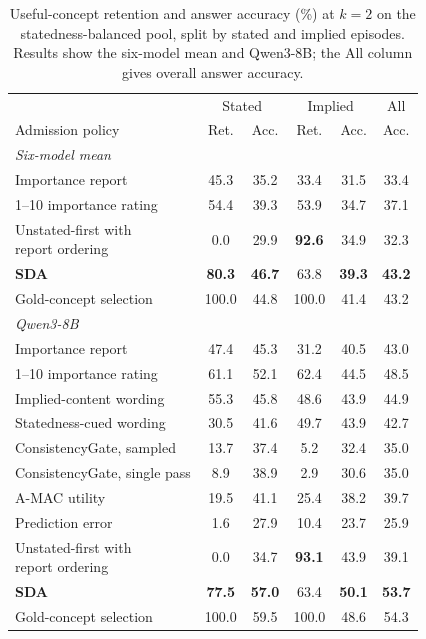 \begin{table}[!htbp]
\centering
\caption{Useful-concept retention and answer accuracy (\%) at $k=2$ on the statedness-balanced pool, split by stated and implied episodes. Results show the six-model mean and Qwen3-8B; the All column gives overall answer accuracy.}
\label{tab:splitfull}
\footnotesize
\setlength{\tabcolsep}{1.9pt}
\begin{tabular}{lccccc}
\toprule
 & \multicolumn{2}{c}{Stated} & \multicolumn{2}{c}{Implied} & All \\
\cmidrule(lr){2-3}\cmidrule(lr){4-5}\cmidrule(lr){6-6}
Admission policy & Ret. & Acc. & Ret. & Acc. & Acc. \\
\midrule
\multicolumn{6}{l}{\emph{Six-model mean}} \\
Importance report & 45.3 & 35.2 & 33.4 & 31.5 & 33.4 \\
1--10 importance rating & 54.4 & 39.3 & 53.9 & 34.7 & 37.1 \\
\shortstack[l]{Unstated-first with\\\quad report ordering} & 0.0 & 29.9 & \textbf{92.6} & 34.9 & 32.3 \\
\textbf{SDA} & \textbf{80.3} & \textbf{46.7} & 63.8 & \textbf{39.3} & \textbf{43.2} \\
 Gold-concept selection & 100.0 & 44.8 & 100.0 & 41.4 & 43.2 \\
\midrule
\multicolumn{6}{l}{\emph{Qwen3-8B}} \\
Importance report & 47.4 & 45.3 & 31.2 & 40.5 & 43.0 \\
1--10 importance rating & 61.1 & 52.1 & 62.4 & 44.5 & 48.5 \\
Implied-content wording & 55.3 & 45.8 & 48.6 & 43.9 & 44.9 \\
Statedness-cued wording & 30.5 & 41.6 & 49.7 & 43.9 & 42.7 \\
ConsistencyGate, sampled & 13.7 & 37.4 & 5.2 & 32.4 & 35.0 \\
ConsistencyGate, single pass & 8.9 & 38.9 & 2.9 & 30.6 & 35.0 \\
A-MAC utility & 19.5 & 41.1 & 25.4 & 38.2 & 39.7 \\
Prediction error & 1.6 & 27.9 & 10.4 & 23.7 & 25.9 \\
\shortstack[l]{Unstated-first with\\\quad report ordering} & 0.0 & 34.7 & \textbf{93.1} & 43.9 & 39.1 \\
\textbf{SDA} & \textbf{77.5} & \textbf{57.0} & 63.4 & \textbf{50.1} & \textbf{53.7} \\
 Gold-concept selection & 100.0 & 59.5 & 100.0 & 48.6 & 54.3 \\
\bottomrule
\end{tabular}
\end{table}
